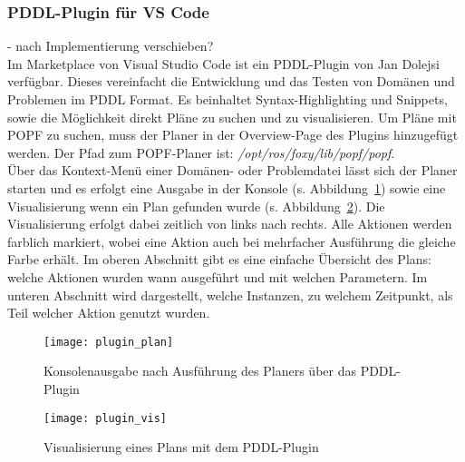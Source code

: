 \subsubsection{PDDL-Plugin für VS Code}
- nach Implementierung verschieben?\\
Im Marketplace von Visual Studio Code ist ein PDDL-Plugin von Jan Dolejsi verfügbar.
Dieses vereinfacht die Entwicklung und das Testen von Domänen und Problemen im PDDL Format.
Es beinhaltet Syntax-Highlighting und Snippets, sowie die Möglichkeit direkt Pläne zu suchen und zu visualisieren.
Um Pläne mit \ac{POPF} zu suchen, muss der Planer in der Overview-Page des Plugins hinzugefügt werden.
Der Pfad zum \ac{POPF}-Planer ist: \emph{/opt/ros/foxy/lib/popf/popf}.\\
Über das Kontext-Menü einer Domänen- oder Problemdatei lässt sich der Planer starten und es erfolgt eine Ausgabe in der Konsole (s. Abbildung~\ref{fig:pluginplan}) sowie eine Visualisierung wenn ein Plan gefunden wurde (s. Abbildung~\ref{fig:pluginvis}).
Die Visualisierung erfolgt dabei zeitlich von links nach rechts.
Alle Aktionen werden farblich markiert, wobei eine Aktion auch bei mehrfacher Ausführung die gleiche Farbe erhält.
Im oberen Abschnitt gibt es eine einfache Übersicht des Plans: welche Aktionen wurden wann ausgeführt und mit welchen Parametern.
Im unteren Abschnitt wird dargestellt, welche Instanzen, zu welchem Zeitpunkt, als Teil welcher Aktion genutzt wurden.
\begin{figure}[ht!]
    \centering
    \texttt{[image: plugin\_plan]}
    \caption{Konsolenausgabe nach Ausführung des Planers über das PDDL-Plugin}
    \label{fig:pluginplan}
\end{figure}

\begin{figure}[ht!]
    \centering
    \texttt{[image: plugin\_vis]}
    \caption{Visualisierung eines Plans mit dem PDDL-Plugin}
    \label{fig:pluginvis}
\end{figure}
